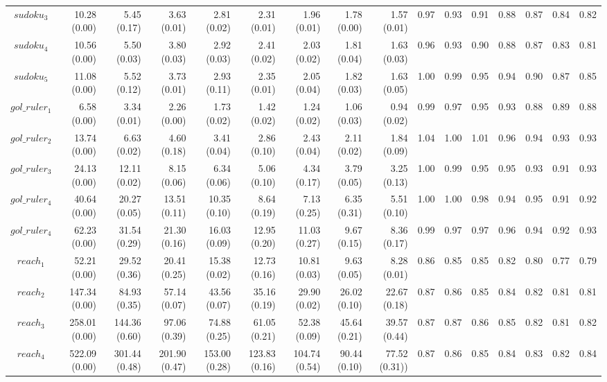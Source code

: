 \documentclass[preprint]{tlp}
\begin{document}
\begin{landscape}
\begin{tabular}{@{\extracolsep{\fill}}|c|r|r|r|r|r|r|r|r||r|r|r|r|r|r|r|}
$sudoku_3$ & 10.28 (0.00) & 5.45 (0.17) & 3.63 (0.01) & 2.81 (0.02) & 2.31 (0.01) & 1.96 (0.01) & 1.78 (0.00) & 1.57 (0.01)& 0.97 & 0.93 & 0.91 & 0.88 & 0.87 & 0.84 & 0.82 \\
$sudoku_4$ & 10.56 (0.00) & 5.50 (0.03) & 3.80 (0.03) & 2.92 (0.03) & 2.41 (0.02) & 2.03 (0.02) & 1.81 (0.04) & 1.63 (0.03)& 0.96 & 0.93 & 0.90 & 0.88 & 0.87 & 0.83 & 0.81 \\
$sudoku_5$ & 11.08 (0.00) & 5.52 (0.12) & 3.73 (0.01) & 2.93 (0.11) & 2.35 (0.01) & 2.05 (0.04) & 1.82 (0.03) & 1.63 (0.05)& 1.00 & 0.99 & 0.95 & 0.94 & 0.90 & 0.87 & 0.85 \\
\cline{1-16}
$gol\_ruler_1$ & 6.58 (0.00) & 3.34 (0.01) & 2.26 (0.00) & 1.73 (0.02) & 1.42 (0.02) & 1.24 (0.02) & 1.06 (0.03) & 0.94 (0.02)& 0.99 & 0.97 & 0.95 & 0.93 & 0.88 & 0.89 & 0.88 \\
$gol\_ruler_2$ & 13.74 (0.00) & 6.63 (0.02) & 4.60 (0.18) & 3.41 (0.04) & 2.86 (0.10) & 2.43 (0.04) & 2.11 (0.02) & 1.84 (0.09)& 1.04 & 1.00 & 1.01 & 0.96 & 0.94 & 0.93 & 0.93\\
$gol\_ruler_3$ & 24.13 (0.00) & 12.11 (0.02) & 8.15 (0.06) & 6.34 (0.06) & 5.06 (0.10) & 4.34 (0.17) & 3.79 (0.05) & 3.25 (0.13)& 1.00 & 0.99 & 0.95 & 0.95 & 0.93 & 0.91 & 0.93\\
$gol\_ruler_4$ & 40.64 (0.00) & 20.27 (0.05) & 13.51 (0.11) & 10.35 (0.10) & 8.64 (0.19) & 7.13 (0.25) & 6.35 (0.31) & 5.51 (0.10)& 1.00 & 1.00 & 0.98 & 0.94 & 0.95 & 0.91 & 0.92 \\
$gol\_ruler_4$ & 62.23 (0.00) & 31.54 (0.29) & 21.30 (0.16) & 16.03 (0.09) & 12.95 (0.20) & 11.03 (0.27) & 9.67 (0.15) & 8.36 (0.17)& 0.99 & 0.97 & 0.97 & 0.96 & 0.94 & 0.92 & 0.93 \\
\cline{1-16}
$reach_1$ & 52.21 (0.00) & 29.52 (0.36) & 20.41 (0.25) & 15.38 (0.02) & 12.73 (0.16) & 10.81 (0.03) & 9.63 (0.05) & 8.28 (0.01)& 0.86 & 0.85 & 0.85 & 0.82 & 0.80 & 0.77 & 0.79 \\
$reach_2$ & 147.34 (0.00) & 84.93 (0.35) & 57.14 (0.07) & 43.56 (0.07) & 35.16 (0.19) & 29.90 (0.02) & 26.02 (0.10) & 22.67 (0.18)& 0.87 & 0.86 & 0.85 & 0.84 & 0.82 & 0.81 & 0.81 \\
$reach_3$ & 258.01 (0.00) & 144.36 (0.60) & 97.06 (0.39) & 74.88 (0.25) & 61.05 (0.21) & 52.38 (0.09) & 45.64 (0.21) & 39.57 (0.44)& 0.87 & 0.87 & 0.86 & 0.85 & 0.82 & 0.81 & 0.82 \\
$reach_4$ & 522.09 (0.00) & 301.44 (0.48) & 201.90 (0.47) & 153.00 (0.28) & 123.83 (0.16) & 104.74 (0.54) & 90.44 (0.10) & 77.52 (0.31))& 0.87 & 0.86 & 0.85 & 0.84 & 0.83 & 0.82 & 0.84 \\

\end{tabular}
\end{landscape}
\end{document}
